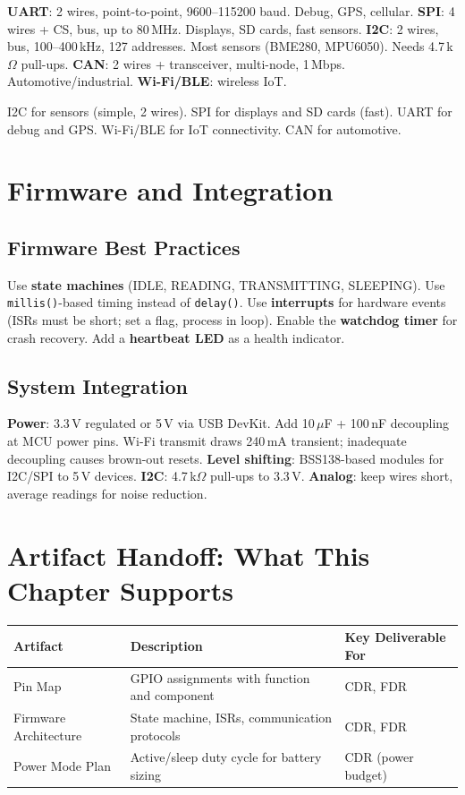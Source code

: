 \textbf{UART}: 2 wires, point-to-point, 9600--115200 baud. Debug, GPS, cellular. \textbf{SPI}: 4 wires + CS, bus, up to 80\,MHz. Displays, SD cards, fast sensors. \textbf{I2C}: 2 wires, bus, 100--400\,kHz, 127 addresses. Most sensors (BME280, MPU6050). Needs 4.7\,k$\Omega$ pull-ups. \textbf{CAN}: 2 wires + transceiver, multi-node, 1\,Mbps. Automotive/industrial. \textbf{Wi-Fi/BLE}: wireless IoT.

\begin{tipbox}
I2C for sensors (simple, 2 wires). SPI for displays and SD cards (fast). UART for debug and GPS. Wi-Fi/BLE for IoT connectivity. CAN for automotive.
\end{tipbox}

\section{Firmware and Integration}
\subsection{Firmware Best Practices}
Use \textbf{state machines} (IDLE, READING, TRANSMITTING, SLEEPING). Use \texttt{millis()}-based timing instead of \texttt{delay()}. Use \textbf{interrupts} for hardware events (ISRs must be short; set a flag, process in loop). Enable the \textbf{watchdog timer} for crash recovery. Add a \textbf{heartbeat LED} as a health indicator.

\subsection{System Integration}
\textbf{Power}: 3.3\,V regulated or 5\,V via USB DevKit. Add 10\,$\mu$F + 100\,nF decoupling at MCU power pins. Wi-Fi transmit draws 240\,mA transient; inadequate decoupling causes brown-out resets. \textbf{Level shifting}: BSS138-based modules for I2C/SPI to 5\,V devices. \textbf{I2C}: 4.7\,k$\Omega$ pull-ups to 3.3\,V. \textbf{Analog}: keep wires short, average readings for noise reduction.

\section{Artifact Handoff: What This Chapter Supports}
\begin{table}[htbp]\centering\small
\begin{tabularx}{\textwidth}{l X l}
\toprule
\textbf{Artifact} & \textbf{Description} & \textbf{Key Deliverable For} \\
\midrule
Pin Map & GPIO assignments with function and component & CDR, FDR \\
Firmware Architecture & State machine, ISRs, communication protocols & CDR, FDR \\
Power Mode Plan & Active/sleep duty cycle for battery sizing & CDR (power budget) \\
\bottomrule
\end{tabularx}
\end{table}


